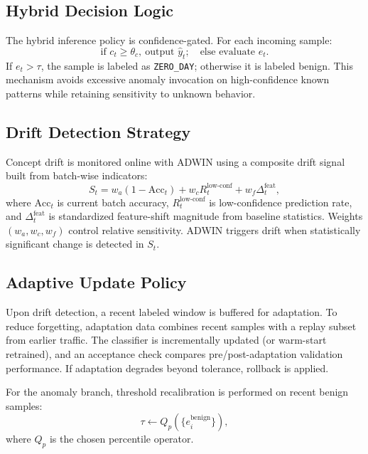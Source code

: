 \documentclass[conference]{IEEEtran}
\begin{document}
\subsection{Hybrid Decision Logic}
The hybrid inference policy is confidence-gated. For each incoming sample:
\begin{equation}
\text{if } c_t \ge \theta_c,\ \text{output } \hat{y}_t;
\quad
\text{else evaluate } e_t.
\end{equation}
If $e_t > \tau$, the sample is labeled as \texttt{ZERO\_DAY}; otherwise it is labeled benign. This mechanism avoids excessive anomaly invocation on high-confidence known patterns while retaining sensitivity to unknown behavior.

\subsection{Drift Detection Strategy}
Concept drift is monitored online with ADWIN \cite{bifet2007learning} using a composite drift signal built from batch-wise indicators:
\begin{equation}
S_t = w_a(1-\text{Acc}_t) + w_c R^{\text{low-conf}}_t + w_f \Delta^{\text{feat}}_t,
\end{equation}
where $\text{Acc}_t$ is current batch accuracy, $R^{\text{low-conf}}_t$ is low-confidence prediction rate, and $\Delta^{\text{feat}}_t$ is standardized feature-shift magnitude from baseline statistics. Weights $(w_a,w_c,w_f)$ control relative sensitivity. ADWIN triggers drift when statistically significant change is detected in $S_t$.

\subsection{Adaptive Update Policy}
Upon drift detection, a recent labeled window is buffered for adaptation. To reduce forgetting, adaptation data combines recent samples with a replay subset from earlier traffic. The classifier is incrementally updated (or warm-start retrained), and an acceptance check compares pre/post-adaptation validation performance. If adaptation degrades beyond tolerance, rollback is applied.

For the anomaly branch, threshold recalibration is performed on recent benign samples:
\begin{equation}
\tau \leftarrow Q_{p}\left(\{e_i^{\text{benign}}\}\right),
\end{equation}
where $Q_p$ is the chosen percentile operator.
\end{document}
